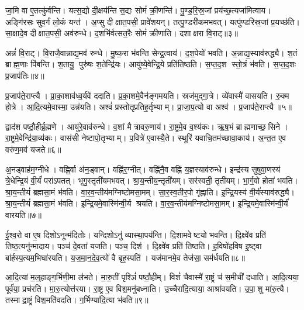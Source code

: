 जा॒मि वा ए॒तत्कु॑र्वन्ति।
यत्स॒द्यो दी॒क्षय॑न्ति स॒द्यः सोमं॑ क्री॒णन्ति॑।
पु॒ण्ड॒रि॒स्र॒जां प्रय॑च्छ॒त्यजा॑मित्वाय।
अङ्गि॑रसः सुव॒र्गं लो॒कं यन्त॑।
अ॒प्सु दीक्षात॒पसी॒ प्रावे॑शयन्।
तत्पु॒ण्डरी॑कमभवत्।
यत्पु॑ण्डरिस्र॒जां प्र॒यच्छ॑ति।
सा॒क्षादे॒व दीक्षात॒पसी॒ अव॑रुन्धे।
द॒शभि॑र्वत्सत॒रैः सोमं॑ क्रीणाति।
दशाक्षरा वि॒राट्॥३॥

अन्नं॑ वि॒राट्।
वि॒राजै॒वान्नाद्य॒मव॑ रुन्धे।
मु॒ष्क॒रा भ॑वन्ति सेन्द्र॒त्वाय॑।
द॒श॒पेयो॑ भवति।
अ॒न्नाद्य॒स्याव॑रुद्ध्यै।
श॒तं ब्राह्म॒णाः पि॑बन्ति।
श॒तायु॒ पुरु॑षः श॒तेन्द्रि॑यः।
आयु॑ष्ये॒वेन्द्रि॒ये प्रति॑तिष्ठति।
स॒प्त॒द॒श स्तो॒त्रं भ॑वति।
स॒प्त॒द॒शः प्र॒जाप॑तिः॥४॥

प्र॒जाप॑ते॒राप्त्यै।
प्रा॒का॒शाव॑ध्व॒र्यवे॑ ददाति।
प्र॒का॒शमे॒वैन॑ङ्गमयति।
स्रज॑मुद्गा॒त्रे।
व्ये॑वास्मै॑ वासयति।
रु॒क्म होत्रे।
आ॒दि॒त्यमे॒वास्मा॒ उन्न॑यति।
अश्वं॑ प्रस्तोतृप्रतिह॒र्तृभ्याम्।
प्रा॒जा॒प॒त्यो वा अश्व॑।
प्र॒जाप॑ते॒राप्त्यै॥५॥

द्वाद॑श पष्ठौ॒हीर्ब्र॒ह्मणे।
आयु॑रे॒वाव॑रुन्धे।
व॒शां मैत्रावरु॒णाय॑।
रा॒ष्ट्रमे॒व व॒श्य॑कः।
ऋ॒ष॒भं ब्राह्मणाच्छ॒सिने।
रा॒ष्ट्रमे॒वेन्द्रि॑या॒व्य॑कः।
वास॑सी नेष्टापो॒तृभ्याम्।
प॒वित्रे॑ ए॒वास्यै॒ते।
स्थूरि॑ यवाचि॒तम॑च्छावा॒काय॑।
अ॒न्त॒त ए॒व वरु॑ण॒मव॑ यजते॥६॥

अ॒नड्वाह॑म॒ग्नीधे।
वह्नि॒र्वा अ॑न॒ड्वान्।
वह्नि॑र॒ग्नीत्।
वह्नि॑नै॒व वह्नि॑ य॒ज्ञस्याव॑रुन्धे।
इन्द्र॑स्य सुषुवा॒णस्य॑ त्रे॒धेन्द्रि॒यं वी॒र्यं॑ परा॑ऽपतत्।
भृगु॒स्तृती॑यमभवत्।
श्रा॒य॒न्तीय॒न्तृती॑यम्।
सर॑स्वती॒ तृती॑यम्।
भा॒र्ग॒वो होता॑ भवति।
श्रा॒य॒न्तीयं॑ ब्रह्मसा॒मं भ॑वति।
वा॒र॒व॒न्तीय॑मग्निष्टोमसा॒मम्।
सा॒र॒स्व॒तीर॒पो गृ॑ह्णाति।
इ॒न्द्रि॒यस्य॑ वी॒र्य॑स्याव॑रुद्ध्यै।
श्रा॒य॒न्तीयं॑ ब्रह्मसा॒मं भ॑वति।
इ॒न्द्रि॒यमे॒वास्मि॑न्वी॒र्य श्रयति।
वा॒र॒व॒न्तीय॑मग्निष्टोमसा॒मम्।
इ॒न्द्रि॒यमे॒वास्मि॑न्वी॒र्यं॑ वारयति॥७॥\anuvakamend[वि॒राट्प्र॒जाप॑ति॒रश्व॑ प्र॒जाप॑ते॒राप्त्यै॑ यजते ब्रह्मसा॒मं भ॑वति स॒प्त च॑]

ई॒श्व॒रो वा ए॒ष दिशोऽनून्म॑दितोः।
यन्दिशोऽनु॑ व्यास्था॒पय॑न्ति।
दि॒शामवेष्टयो भवन्ति।
दि॒क्ष्वे॑व प्रति॑ तिष्ठ॒त्यनु॑न्मादाय।
पञ्च॑ दे॒वता॑ यजति।
पञ्च॒ दिश॑।
दि॒क्ष्वे॑व प्रति॑ तिष्ठति।
ह॒विषो॑हविष इ॒ष्ट्वा बा॑र्\mbox{}हस्प॒त्यम॒भिघा॑रयति।
य॒ज॒मा॒न॒दे॒व॒त्यो॑ वै बृह॒स्पति॑।
यज॑मानमे॒व तेज॑सा॒ सम॑र्धयति॥८॥

आ॒दि॒त्यां म॒ल्॒हाङ्ग॒र्भिणी॒मा ल॑भते।
मा॒रु॒तीं पृश्ञिं॑ पष्ठौ॒हीम्।
विशं॑ चैवास्मै॑ रा॒ष्ट्रं च॑ स॒मीची॑ दधाति।
आ॒दि॒त्यया॒ पूर्व॑या॒ प्रच॑रति।
मा॒रु॒त्योत्त॑रया।
रा॒ष्ट्र ए॒व विश॒मनु॑बध्नाति।
उ॒च्चैरा॑दि॒त्याया॒ आश्रा॑वयति।
उ॒पा॒शु मा॑रु॒त्यै।
तस्माद्रा॒ष्ट्रं विश॒मति॑वदति।
ग॒र्भिण्या॑दि॒त्या भ॑वति॥९॥

